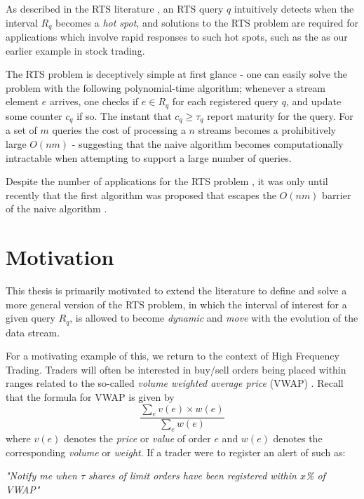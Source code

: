 As described in the RTS literature \cite{GAN16, DBLP:conf/sigmod/ZhangGBKCZ22}, an RTS query $q$ intuitively detects when the interval $R_q$ becomes a \textit{hot spot}, and solutions to the RTS problem are required for applications which involve rapid responses to such hot spots, such as the as our earlier example in stock trading.

The RTS problem is deceptively simple at first glance - one can easily solve the problem with the following polynomial-time algorithm; whenever a stream element $e$ arrives, one checks if $e\in R_q$ for each registered query $q$, and update some counter $c_q$ if so. The instant that $c_q \geq \tau_q$ report maturity for the query. For a set of $m$ queries the cost of processing a $n$ streams becomes a prohibitively large $O(nm)$ - suggesting that the naive algorithm becomes computationally intractable when attempting to support a large number of queries. 

Despite the number of applications for the RTS problem \cite{DBLP:conf/sigmod/ZhangGBKCZ22}, it was only until recently that the first algorithm was proposed that escapes the $O(nm)$ barrier of the naive algorithm \cite{GAN16}. 

\section{Motivation}
\label{sec:motivation}
This thesis is primarily motivated to extend the literature to define and solve a more general version of the RTS problem, in which the interval of interest for a given query $R_q$, is allowed to become \textit{dynamic} and \textit{move} with the evolution of the data stream. 

For a motivating example of this, we return to the context of High Frequency Trading. Traders will often be interested in buy/sell orders being placed within ranges related to the so-called \textit{volume weighted average price} (VWAP) \cite{vwap}. Recall that the formula for VWAP is given by 
\begin{equation}
    \frac{\sum_{e}v(e) \times w(e)}{\sum_{e}w(e)}
\end{equation}
where $v(e)$ denotes the \textit{price} or \textit{value} of order $e$ and $w(e)$ denotes the corresponding \textit{volume} or \textit{weight}. If a trader were to register an alert of such as:

\textit{"Notify me when $\tau$ shares of limit orders have been registered within $x$\% of VWAP"}


